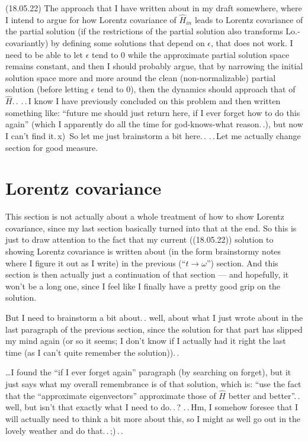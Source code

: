 \documentclass{report}
\begin{document}
(18.05.22) The approach that I have written about in my draft somewhere, where I intend to argue for how Lorentz covariance of $\hat H_{in}$ leads to Lorentz covariance of the partial solution (if the restrictions of the partial solution also transforms Lo.-covariantly) by defining some solutions that depend on $\epsilon$, that does not work. I need to be able to let $\epsilon$ tend to 0 while the approximate partial solution space remains constant, and then I should probably argue, that by narrowing the initial solution space more and more around the clean (non-normalizable) partial solution (before letting $\epsilon$ tend to 0), then the dynamics should approach that of $\hat H$.\,. .\,.\,I know I have previously concluded on this problem and then written something like: ``future me should just return here, if I ever forget how to do this again'' (which I apparently do all the time for god-knows-what reason.\,.), but now I can't find it.\,x)\, So let me just brainstorm a bit here.\,. .\,.\,Let me actually change section for good measure.


\section{Lorentz covariance}
This section is not actually about a whole treatment of how to show Lorentz covariance, since my last section basically turned into that at the end. So this is just to draw attention to the fact that my current ((18.05.22)) solution to showing Lorentz covariance is written about (in the form brainstormy notes where I figure it out as I write) in the previous (``$t\to\omega$'') section. And this section is then actually just a continuation of that section --- and hopefully, it won't be a long one, since I feel like I finally have a pretty good grip on the solution.

But I need to brainstorm a bit about.\,. well, about what I just wrote about in the last paragraph of the previous section, since the solution for that part has slipped my mind again (or so it seems; I don't know if I actually had it right the last time (as I can't quite remember the solution)).\,. 

\ldots I found the ``if I ever forget again'' paragraph (by searching on forget), but it just says what my overall remembrance is of that solution, which is: ``use the fact that the ``approximate eigenvectors'' approximate those of $\hat H$ better and better''.\,. well, but isn't that exactly what I need to do.\,.\,? .\,.\,Hm, I somehow foresee that I will actually need to think a bit more about this, so I might as well go out in the lovely weather and do that.\,.\,;)\,.\,.  
\end{document}
